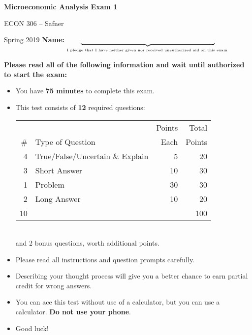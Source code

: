\centerline{\huge \bf Microeconomic Analysis Exam 1}     
\vfill \vfill
   
ECON 306 -- Safner                            %

Spring 2019 \hfill                             %
{\bf Name: } $\underbrace{\hspace{2.7in}}_{\mbox{\tiny I pledge that I have neither given nor received unauthorized aid on this exam }}$
\\
\vfill \vfill \vfill

{\bf Please read all of the following information and wait until authorized to start the exam:}
\vspace{1pc}

\begin{itemize}                        %
	\item You have \textbf{75 minutes} to complete this exam.  
	\item This test consists of \textbf{12} required questions:\\
	\begin{table}[h!]
	\centering 	

	\begin{tabular}{rlrr}
	&  & Points & Total \\ 
	\# & Type of Question & Each & Points\\ \toprule
	4 & True/False/Uncertain \& Explain & 5 & 20\\
	3 & Short Answer & 10 & 30\\
	1 & Problem & 30 & 30\\
	2 & Long Answer & 10 & 20\\ \midrule 
	10 &  & & 100\\ \bottomrule
	\end{tabular}
		\end{table}\\
 and 2 bonus questions, worth additional points.
	\item Please read all instructions and question prompts carefully.
	\item Describing your thought process will give you a better chance to earn partial credit for wrong answers. 
	\item You can ace this test without use of a calculator, but you can use a calculator. \textbf{Do not use your phone}. 
	\item Good luck!
\end{itemize}

\vfill \vfill \vfill

\clearpage 

